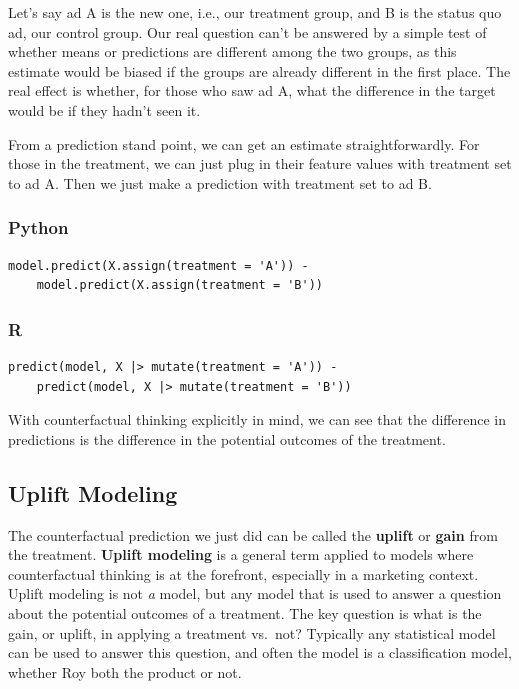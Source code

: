 \documentclass[
  letterpaper,
]{krantz}
\begin{document}
Let's say ad A is the new one, i.e., our treatment group, and B is the
status quo ad, our control group. Our real question can't be answered by
a simple test of whether means or predictions are different among the
two groups, as this estimate would be biased if the groups are already
different in the first place. The real effect is whether, for those who
saw ad A, what the difference in the target would be if they hadn't seen
it.

From a prediction stand point, we can get an estimate straightforwardly.
For those in the treatment, we can just plug in their feature values
with treatment set to ad A. Then we just make a prediction with
treatment set to ad B.

\subsubsection{Python}

\begin{verbatim}
model.predict(X.assign(treatment = 'A')) - 
    model.predict(X.assign(treatment = 'B'))
\end{verbatim}

\subsubsection{R}

\begin{verbatim}
predict(model, X |> mutate(treatment = 'A')) - 
    predict(model, X |> mutate(treatment = 'B'))
\end{verbatim}

With counterfactual thinking explicitly in mind, we can see that the
difference in predictions is the difference in the potential outcomes of
the treatment.

\subsection{Uplift Modeling}\label{uplift-modeling}

The counterfactual prediction we just did can be called the
\textbf{uplift} or \textbf{gain} from the treatment. \textbf{Uplift
modeling} is a general term applied to models where counterfactual
thinking is at the forefront, especially in a marketing context. Uplift
modeling is not \emph{a} model, but any model that is used to answer a
question about the potential outcomes of a treatment. The key question
is what is the gain, or uplift, in applying a treatment vs.~not?
Typically any statistical model can be used to answer this question, and
often the model is a classification model, whether Roy both the product
or not.
\end{document}
